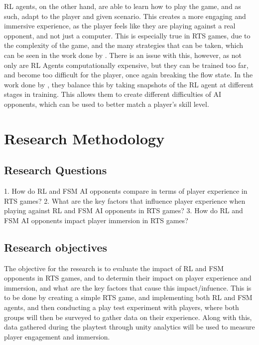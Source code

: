 \documentclass[conference]{IEEEtran}
\begin{document}
RL agents, on the other hand, are able to learn how to play the game, and as such, adapt to the player and given scenario. This creates a more engaging
and immersive experience, as the player feels like they are playing against a real opponent, and not just a computer. This is especially true in RTS games,
due to the complexity of the game, and the many strategies that can be taken, which can be seen in the work done by \cite{vinyals_grandmaster_2019}.
There is an issue with this, however, as not only are RL Agents computationally expensive, but they can be trained too far, and become too difficult for the player,
once again breaking the flow state. In the work done by \cite{grech_creating_2023}, they balance this by taking snapshots of the RL agent at different
stages in training. This allows them to create different difficulties of AI opponents, which can be used to better match a player's skill level.



\section{Research Methodology}

\subsection{Research Questions}

1. How do RL and FSM AI opponents compare in terms of player experience in RTS games?
2. What are the key factors that influence player experience when playing against RL and FSM AI opponents in RTS games?
3. How do RL and FSM AI opponents impact player immersion in RTS games?

\subsection{Research objectives}

The objective for the research is to evaluate the impact of RL and FSM opponents in RTS games, and to determin their impact on player experience and immersion,
and what are the key factors that cause this impact/infuence. This is to be done by creating a simple RTS game, and implementing both RL and FSM agents,
and then conducting a play test experiment with players, where both groups will then be surveyed to gather data on their experience. Along with this,
data gathered during the playtest through unity analytics will be used to measure player engagement and immersion.
\end{document}
